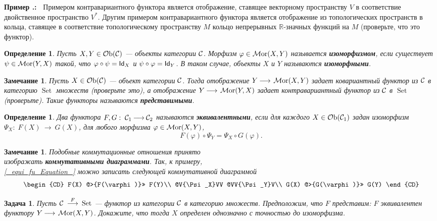 \documentclass[12pt]{book}
\newcommand{\arrow}{{\:\longrightarrow\:}}
\renewcommand{\phi}{\varphi}
\def\Id{{\operatorname{\sf Id}}}
\newcommand{\Set}{\operatorname{Set}}
\newcommand{\Ob}{\operatorname{{\cal O}b}}
\newcommand{\Mor}{\operatorname{{\cal M}or}}
\newcommand{\cac}{{\cal C}}
\def\R{{\mathbb R}}
\theoremstyle{upshape}
\newtheorem{zadacha}{Задача}[chapter]
\theoremstyle{generic}
\newtheorem{opredelenie}[teorema]{Определение}
\newtheorem{remark}[teorema]{Замечание}
\def\замечание{\begin{remark}}
\def\еза{\end{remark}}
\theoremstyle{upshapenonumber}
\newcommand{\следствие}{%
     \refstepcounter{teorema}
     {\noindent\bf Следствие \thechapter.\arabic{teorema}:\ }}
\newcommand{\пример}{%
     \refstepcounter{teorema}
     {\noindent\bf Пример \thechapter.\arabic{teorema}:\ }}
\newcommand{\лемма}{%
     \refstepcounter{teorema}
     {\noindent\bf Лемма \thechapter.\arabic{teorema}:\ }}
\newcommand{\теорема}{%
     \refstepcounter{teorema}
     {\noindent\bf Теорема \thechapter.\arabic{teorema}:\ }}
\newcommand{\утверждение}{%
     \refstepcounter{teorema}
     {\noindent\bf Утверждение \thechapter.\arabic{teorema}:\ }}
\def\бф{\bf}
\def\ем{\em}
\def\ит{\it}
\def\задача{\begin{zadacha}}
\def\ез{\end{zadacha}}
\def\еу{\end{ukazanie}}
\def\определение{\begin{opredelenie}}
\def\ео{\end{opredelenie}}
\def\енум{\begin{enumerate}}
\def\ее{\end{enumerate}}
\def\итем{\item %
}
\begin{document}
\пример
Примером контравариантного функтора является
отображение, ставящее векторному пространству 
$V$ в соответствие двойственное пространство $V^*$.
Другим примером контравариантного функтора является отображение
из топологических пространств в кольца, ставящее
в соответствие топологическому пространству $M$ кольцо
непрерывных $\R$-\-зна\-ч\-ных функций на $M$
(проверьте, что это функтор).

\определение
Пусть $X, Y\in \Ob(\cac)$ --- объекты категории $\cac$.
Морфизм $\phi\in \Mor(X,Y)$ называется {\бф изоморфизмом},
если существует $\psi\in \Mor(Y,X)$ такой, что
$\phi \circ \psi = \Id_X$ и $\psi\circ\phi = \Id_Y$.
В таком случае, объекты $X$ и $Y$ называются
{\бф изоморфными}.
\ео

\замечание
Пусть $X\in \Ob(\cac)$ --- объект категории $\cac$.
Тогда отображение $Y\arrow \Mor(X,Y)$ задает ковариантный
функтор из $\cac$ в категорию $\Set$ множеств (проверьте это),
а отображение $Y\arrow \Mor(Y, X)$ задает контравариантный
функтор из $\cac$ в  $\Set$ (проверьте). Такие функторы
называются {\бф представимыми}.
\еза

\определение
Два функтора $F, G:\;\cac_1\arrow \cac_2$ 
называются {\бф эквивалентными}, если для каждого 
$X \in \Ob(\cac_1)$ задан изоморфизм $\Psi_X:\; F(X) \arrow
G(X)$, для любого морфизма $\phi\in \Mor(X,Y)$,
\begin{equation}\label{_equi_fu_Equation_}
 F(\phi) \circ \Psi_Y= \Psi_X\circ G(\phi).
\end{equation}
\ео

\замечание
Подобные коммутационные отношения принято \\изображать
{\бф коммутативными диаграммами}. Так, к примеру,\\
\eqref{_equi_fu_Equation_} можно записать следующей
коммутативной диаграммой
\begin{equation}\label{_de_Rham_Equation_} 
\begin{CD}
F(X) @>{F(\phi)}>> F(Y)\\
@V{\Psi_X}VV @VV{\Psi_Y}V\\
G(X) @>{G(\phi)}>> G(Y)
\end{CD}
\end{equation}
\еза



\задача
Пусть $\cac \stackrel F\arrow \Set$ --- функтор из категории $\cac$ в
категорию множеств. Предположим, что $F$ {\em представим:}
$F$ эквивалентен функтору $Y \arrow \Mor(X,Y)$. Докажите, что тогда $X$ определен
однозначно с точностью до изоморфизма.
\ез
\end{document}

